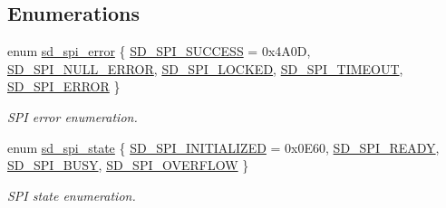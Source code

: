 \subsection*{Enumerations}
\begin{DoxyCompactItemize}
\item 
enum \mbox{\hyperlink{group___s_d___s_p_i___types_ga9ae67f7089a8196e9c6b74b8a6708c2e}{sd\+\_\+spi\+\_\+error}} \{ \newline
\mbox{\hyperlink{group___s_d___s_p_i___types_gga9ae67f7089a8196e9c6b74b8a6708c2ea109567296b93a03b1949407009750681}{S\+D\+\_\+\+S\+P\+I\+\_\+\+S\+U\+C\+C\+E\+SS}} = 0x4\+A0D, 
\mbox{\hyperlink{group___s_d___s_p_i___types_gga9ae67f7089a8196e9c6b74b8a6708c2eaad5c42032f18bd5aafbbf60754614fc1}{S\+D\+\_\+\+S\+P\+I\+\_\+\+N\+U\+L\+L\+\_\+\+E\+R\+R\+OR}}, 
\mbox{\hyperlink{group___s_d___s_p_i___types_gga9ae67f7089a8196e9c6b74b8a6708c2eaa7e23f729a2493076dfb261678471c24}{S\+D\+\_\+\+S\+P\+I\+\_\+\+L\+O\+C\+K\+ED}}, 
\mbox{\hyperlink{group___s_d___s_p_i___types_gga9ae67f7089a8196e9c6b74b8a6708c2ea6281bf8a7232d9947bdc676856008ede}{S\+D\+\_\+\+S\+P\+I\+\_\+\+T\+I\+M\+E\+O\+UT}}, 
\newline
\mbox{\hyperlink{group___s_d___s_p_i___types_gga9ae67f7089a8196e9c6b74b8a6708c2eae8bfc341906b1dcb2431a61007acd4f0}{S\+D\+\_\+\+S\+P\+I\+\_\+\+E\+R\+R\+OR}}
 \}
\begin{DoxyCompactList}\small\item\em S\+PI error enumeration. \end{DoxyCompactList}\item 
enum \mbox{\hyperlink{group___s_d___s_p_i___types_gaf0ec45d302a4c5a4af552acb7a001fa1}{sd\+\_\+spi\+\_\+state}} \{ \mbox{\hyperlink{group___s_d___s_p_i___types_ggaf0ec45d302a4c5a4af552acb7a001fa1ad057fdd1f53eb35b0a42e4d539ae0702}{S\+D\+\_\+\+S\+P\+I\+\_\+\+I\+N\+I\+T\+I\+A\+L\+I\+Z\+ED}} = 0x0\+E60, 
\mbox{\hyperlink{group___s_d___s_p_i___types_ggaf0ec45d302a4c5a4af552acb7a001fa1a9f9c603a855647ea19336bcfe7637fa4}{S\+D\+\_\+\+S\+P\+I\+\_\+\+R\+E\+A\+DY}}, 
\mbox{\hyperlink{group___s_d___s_p_i___types_ggaf0ec45d302a4c5a4af552acb7a001fa1aae8d52aee0a4d321db6702f906522b98}{S\+D\+\_\+\+S\+P\+I\+\_\+\+B\+U\+SY}}, 
\mbox{\hyperlink{group___s_d___s_p_i___types_ggaf0ec45d302a4c5a4af552acb7a001fa1acedf52aae178e30eb1dd620d8db30456}{S\+D\+\_\+\+S\+P\+I\+\_\+\+O\+V\+E\+R\+F\+L\+OW}}
 \}
\begin{DoxyCompactList}\small\item\em S\+PI state enumeration. \end{DoxyCompactList}\item 

\end{DoxyCompactItemize}
